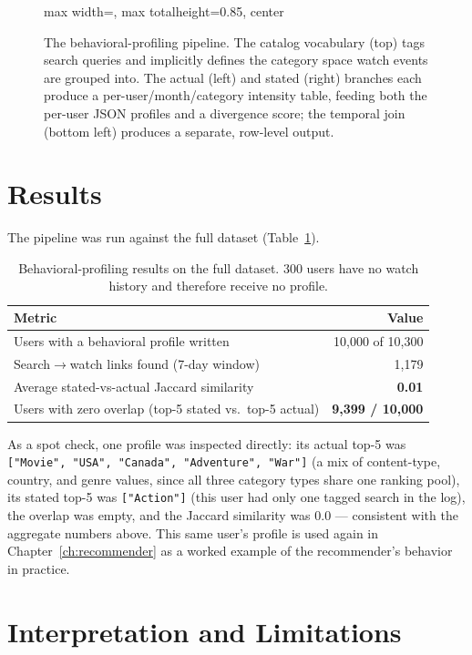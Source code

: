 \documentclass[11pt,a4paper,oneside]{book}
\newcommand{\code}[1]{\texttt{#1}}
\begin{document}
\begin{figure}[H]
\begin{adjustbox}{max width=\textwidth, max totalheight=0.85\textheight, center}
\begin{tikzpicture}[node distance=1.0cm and 1.3cm]
\end{tikzpicture}
\end{adjustbox}
\caption{The behavioral-profiling pipeline. The catalog vocabulary (top) tags search queries and
implicitly defines the category space watch events are grouped into. The actual (left) and stated
(right) branches each produce a per-user/month/category intensity table, feeding both the per-user
JSON profiles and a divergence score; the temporal join (bottom left) produces a separate,
row-level output.}
\label{fig:behavior-pipeline}
\end{figure}

\section{Results}
\label{sec:behavior-results}

The pipeline was run against the full dataset (Table~\ref{tab:behavior-results}).

\begin{table}[H]
\centering
\begin{tabular}{lr}
\toprule
\textbf{Metric} & \textbf{Value} \\
\midrule
Users with a behavioral profile written & 10{,}000 of 10{,}300 \\
Search$\to$watch links found (7-day window) & 1{,}179 \\
Average stated-vs-actual Jaccard similarity & \textbf{0.01} \\
Users with zero overlap (top-5 stated vs.\ top-5 actual) & \textbf{9{,}399 / 10{,}000} \\
\bottomrule
\end{tabular}
\caption{Behavioral-profiling results on the full dataset. 300 users have no watch history and
therefore receive no profile.}
\label{tab:behavior-results}
\end{table}

As a spot check, one profile was inspected directly: its actual top-5 was \code{["Movie", "USA",
"Canada", "Adventure", "War"]} (a mix of content-type, country, and genre values, since all three
category types share one ranking pool), its stated top-5 was \code{["Action"]} (this user had only
one tagged search in the log), the overlap was empty, and the Jaccard similarity was $0.0$ ---
consistent with the aggregate numbers above. This same user's profile is used again in
Chapter~\ref{ch:recommender} as a worked example of the recommender's behavior in practice.

\section{Interpretation and Limitations}
\label{sec:behavior-limits}
\end{document}
